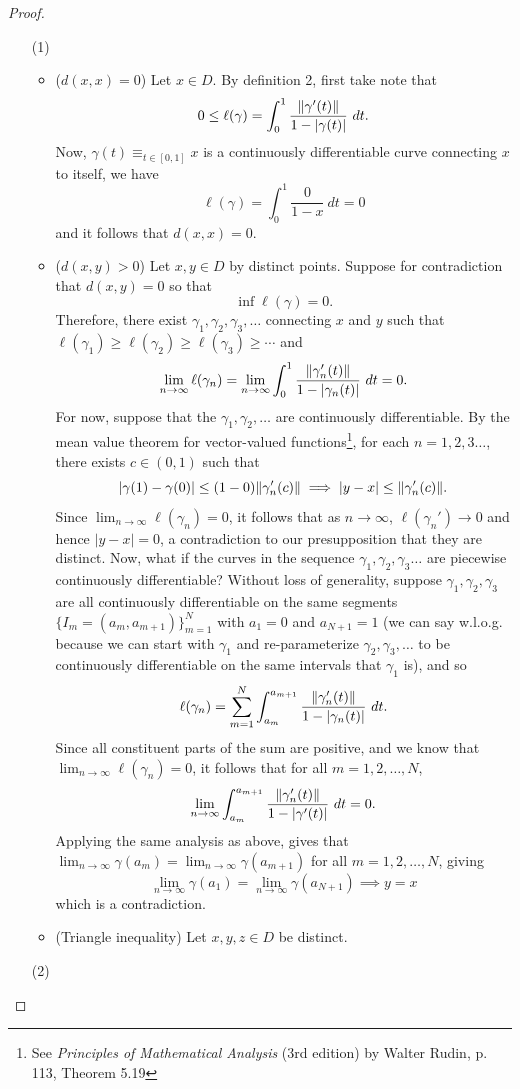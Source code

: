 \documentclass[10pt]{article}
\theoremstyle{plain}
\begin{document}
		\begin{proof} ~
			\begin{itemize}
				\item[(1)] ~
					\begin{itemize}
						\item ($d(x, x) = 0$) Let $x \in D$. By definition 2, first take note that $$0 \leq \ell(\gamma) = \int_0^1 \frac{\norm{\gamma'(t)}}{1 - |\gamma(t)|} \ dt.$$ Now, $\gamma(t) \equiv_{t \in [0, 1]} x$ is a continuously differentiable curve connecting $x$ to itself, we have $$\ell(\gamma) = \int_0^1 \frac{0}{1 - x} \ dt = 0$$ and it follows that $d(x, x) = 0$.
						
						\item ($d(x, y) > 0$) Let $x, y \in D$ by distinct points. Suppose for contradiction that $d(x, y) = 0$ so that $$\inf \ell(\gamma) = 0.$$ Therefore, there exist $\gamma_1, \gamma_2, \gamma_3, \dots$ connecting $x$ and $y$ such that $\ell(\gamma_1) \geq \ell(\gamma_2) \geq \ell(\gamma_3) \geq \cdots$ and $$\lim_{n \to \infty} \ell(\gamma_n) =  \lim_{n \to \infty} \int_0^1 \frac{\norm{\gamma_n'(t)}}{1 - |\gamma_n(t)|} \ dt= 0.$$ For now, suppose that the $\gamma_1, \gamma_2, \dots$ are continuously differentiable. By the mean value theorem for vector-valued functions\footnote{See \textit{Principles of Mathematical Analysis} (3rd edition) by Walter Rudin, p. 113, Theorem 5.19}, for each $n = 1, 2, 3 \dots$, there exists $c \in (0, 1)$ such that $$|\gamma(1) - \gamma(0)| \leq (1 - 0)\norm{\gamma_n'(c)} \implies |y - x| \leq \norm{\gamma_n'(c)}.$$  Since $\lim_{n \to \infty} \ell(\gamma_n) = 0$, it follows that as $n \to \infty$, $\ell(\gamma_n') \to 0$ and hence $|y - x| = 0$, a contradiction to our presupposition that they are distinct. Now, what if the curves in the sequence $\gamma_1, \gamma_2, \gamma_3 \dots$ are piecewise continuously differentiable? Without loss of generality, suppose $\gamma_1, \gamma_2, \gamma_3$ are all continuously differentiable on the same segments $\{I_m = (a_m, a_{m + 1})\}_{m = 1}^N$ with $a_1 = 0$ and $a_{N + 1} = 1$ (we can say w.l.o.g. because we can start with $\gamma_1$ and re-parameterize $\gamma_2, \gamma_3, \dots$ to be continuously differentiable on the same intervals that $\gamma_1$ is), and so $$\ell(\gamma_n) = \sum_{m = 1}^N \int_{a_m}^{a_{m + 1}} \frac{\norm{\gamma_n'(t)}}{1 - |\gamma_n(t)|} \ dt.$$ Since all constituent parts of the sum are positive, and we know that $\lim_{n \to \infty} \ell(\gamma_n) = 0$, it follows that for all $m = 1, 2, \dots, N$, $$\lim_{n \to \infty} \int_{a_m}^{a_{m + 1}} \frac{\norm{\gamma_n'(t)}}{1 - |\gamma'(t)|} \ dt = 0.$$ Applying the same analysis as above, gives that $\lim_{n \to \infty} \gamma(a_m) = \lim_{n \to \infty} \gamma(a_{m + 1})$ for all $m = 1, 2, \dots, N$, giving $$ \lim_{n \to \infty} \gamma(a_1) = \lim_{n \to \infty} \gamma(a_{N + 1}) \implies y = x$$ which is a contradiction.  
						
						\item (Triangle inequality) Let $x, y, z \in D$ be distinct.  
					\end{itemize}
				
				\item[(2)]
			\end{itemize}
		\end{proof}
\end{document}

